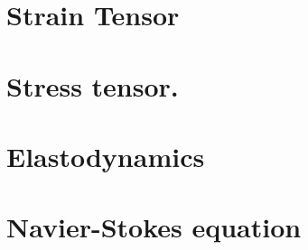    


   \chapter{Strain Tensor}
      
      
      
      
      
      

   \chapter{Stress tensor.}
      
      
      
      
      
      
      
      

   \chapter{Elastodynamics}
      
      
      
      
      

   \chapter{Navier-Stokes equation}
      
      
      
      
      

